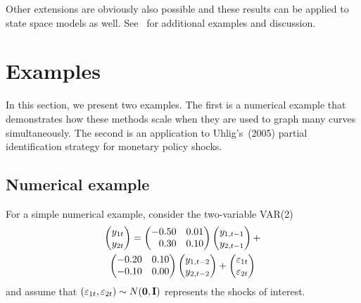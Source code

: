 \documentclass[AER,reviewmode]{tex/AEA}
\begin{document}
Other extensions are obviously also possible and these results can
be applied to state space models as well. See~\citet{HaS:13} for
additional examples and discussion.

\section{Examples}
\label{S3}

\noindent%
In this section, we present two examples. The first is a numerical
example that demonstrates how these methods scale when they are used
to graph many curves simultaneously. The second is an application to
Uhlig's~(2005) partial identification strategy for monetary policy
shocks.
\nocite{Uhl:05}

\subsection{Numerical example}
\label{S3.1}

\noindent%
For a simple numerical example, consider the two-variable VAR(2)
\begin{multline}
  \label{eq:12}
  \begin{pmatrix*}[l]
    y_{1t} \\ y_{2t}
  \end{pmatrix*}
  =
  \begin{pmatrix*}[r]
    - 0.50 & 0.01 \\ 0.30 & 0.10
  \end{pmatrix*}
  \begin{pmatrix*}[l]
    y_{1,t-1} \\ y_{2,t-1}
  \end{pmatrix*}
  + \\
  \begin{pmatrix*}[r]
    -0.20 & 0.10 \\ -0.10 & 0.00
  \end{pmatrix*}
  \begin{pmatrix*}[l]
    y_{1,t-2} \\ y_{2,t-2}
  \end{pmatrix*}
  +
  \begin{pmatrix*}[l]
    \vep_{1t} \\ \vep_{2t}
  \end{pmatrix*}
\end{multline}
and assume that $(\varepsilon_{1t},\varepsilon_{2t}) \sim N(\bm{0},\mathbf{I})$ represents the
shocks of interest.
\end{document}
